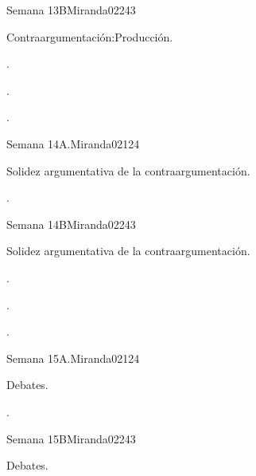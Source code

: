 \begin{syllabus}
\begin{unit}{}{Semana 13B}{Miranda02}{24}{3}
   \begin{topics}
      \item Contraargumentación:Producción.
   \end{topics}

   \begin{learningoutcomes}
      \item . 
      \item .
      \item . 
      \end{learningoutcomes}
\end{unit}

\begin{unit}{}{Semana 14A.}{Miranda02}{12}{4}
   \begin{topics}
      \item Solidez argumentativa de la contraargumentación. 
   \end{topics}
   \begin{learningoutcomes}
      \item . 
   \end{learningoutcomes}
\end{unit}

\begin{unit}{}{Semana 14B}{Miranda02}{24}{3}
   \begin{topics}
      \item Solidez argumentativa de la contraargumentación.
   \end{topics}

   \begin{learningoutcomes}
      \item . 
      \item .
      \item . 
      \end{learningoutcomes}
\end{unit}

\begin{unit}{}{Semana 15A.}{Miranda02}{12}{4}
   \begin{topics}
      \item Debates.
   \end{topics}
   \begin{learningoutcomes}
      \item . 
   \end{learningoutcomes}
\end{unit}

\begin{unit}{}{Semana 15B}{Miranda02}{24}{3}
   \begin{topics}
      \item Debates.
   \end{topics}


\end{unit}
\end{syllabus}
